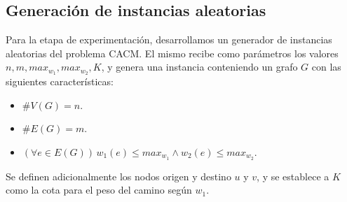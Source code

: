 \subsection{Generación de instancias aleatorias}
\label{subsec:generacion-instancias-aleatorias}

Para la etapa de experimentación, desarrollamos un generador de instancias aleatorias del problema CACM. El mismo recibe como parámetros los valores $n, m, max_{w_1}, max_{w_2}, K$, y genera una instancia conteniendo un grafo $G$ con las siguientes características:

\begin{itemize}
  \item $\#V(G) = n$.
  \item $\#E(G) = m$.
  \item $(\forall e \in E(G))\,w_1(e) \leq max_{w_1} \land w_2(e) \leq max_{w_2}$.
\end{itemize}

Se definen adicionalmente los nodos origen y destino $u$ y $v$, y se establece a $K$ como la cota para el peso del camino según $w_1$.